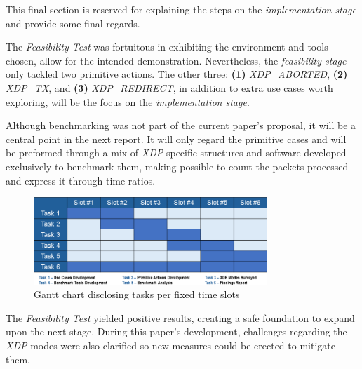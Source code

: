 This final section is reserved for explaining the steps on the \textit{implementation stage} and provide some final regards.

The \textit{Feasibility Test} was fortuitous in exhibiting the environment and tools chosen, allow for the intended demonstration.
Nevertheless, the \textit{feasibility stage} only tackled \hyperref[sec:Feasibility]{two primitive actions}.
The \hyperref[sec:Introduction]{other three}: \textbf{(1)} \textit{XDP\_ABORTED}, \textbf{(2)} \textit{XDP\_TX}, and \textbf{(3)} \textit{XDP\_REDIRECT}, in addition to extra use cases worth exploring, will be the focus on the \textit{implementation stage}. 

Although benchmarking was not part of the current paper's proposal, it will be a central point in the next report.
It will only regard the primitive cases and will be preformed through a mix of \textit{XDP} specific structures and software developed exclusively to benchmark them, making possible to count the packets processed and express it through time ratios.

\begin{figure}[h]
    \centering
    \includegraphics[width=250pt]{src/figures/roadmap.PNG}
    \caption{Gantt chart disclosing tasks per fixed time slots}
\end{figure}

The \textit{Feasibility Test} yielded positive results, creating a safe foundation to expand upon the next stage.
During this paper's development, challenges regarding the \textit{XDP} modes were also clarified so new measures could be erected to mitigate them.